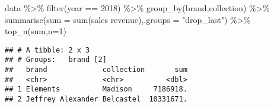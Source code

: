 \documentclass[
]{article}
\newenvironment{Shaded}{\begin{snugshade}}{\end{snugshade}}
\newcommand{\AttributeTok}[1]{\textcolor[rgb]{0.77,0.63,0.00}{#1}}
\newcommand{\DecValTok}[1]{\textcolor[rgb]{0.00,0.00,0.81}{#1}}
\newcommand{\FunctionTok}[1]{\textcolor[rgb]{0.00,0.00,0.00}{#1}}
\newcommand{\NormalTok}[1]{#1}
\newcommand{\SpecialCharTok}[1]{\textcolor[rgb]{0.00,0.00,0.00}{#1}}
\newcommand{\StringTok}[1]{\textcolor[rgb]{0.31,0.60,0.02}{#1}}
\begin{document}
\begin{Shaded}
\begin{Highlighting}[]
\NormalTok{data }\SpecialCharTok{\%\textgreater{}\%}
  \FunctionTok{filter}\NormalTok{(year }\SpecialCharTok{==} \DecValTok{2018}\NormalTok{) }\SpecialCharTok{\%\textgreater{}\%}
  \FunctionTok{group\_by}\NormalTok{(brand,collection) }\SpecialCharTok{\%\textgreater{}\%}
  \FunctionTok{summarise}\NormalTok{(}\AttributeTok{sum =} \FunctionTok{sum}\NormalTok{(}\StringTok{\textasciigrave{}}\AttributeTok{sales revenue}\StringTok{\textasciigrave{}}\NormalTok{),}\AttributeTok{.groups =} \StringTok{"drop\_last"}\NormalTok{) }\SpecialCharTok{\%\textgreater{}\%}
  \FunctionTok{top\_n}\NormalTok{(sum,}\AttributeTok{n=}\DecValTok{1}\NormalTok{)}
\end{Highlighting}
\end{Shaded}

\begin{verbatim}
## # A tibble: 2 x 3
## # Groups:   brand [2]
##   brand             collection       sum
##   <chr>             <chr>          <dbl>
## 1 Elements          Madison     7186918.
## 2 Jeffrey Alexander Belcastel  10331671.
\end{verbatim}
\end{document}
